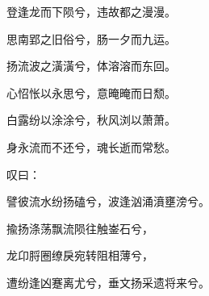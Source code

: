 \documentclass[UTF8,titlepage,oneside]{ctexbook}
\begin{document}
\begin{center}
	登逢龙而下陨兮，违故都之漫漫。
	
	思南郢之旧俗兮，肠一夕而九运。
	
	扬流波之潢潢兮，体溶溶而东回。
	
	心怊怅以永思兮，意晻晻而日颓。
	
	白露纷以涂涂兮，秋风浏以萧萧。
	
	身永流而不还兮，魂长逝而常愁。
	
	叹曰：
	
	譬彼流水纷扬磕兮，波逢汹涌濆壅滂兮。
	
	揄扬涤荡飘流陨往触崟石兮，
	
	龙卬脟圈缭戾宛转阻相薄兮，
	
	遭纷逢凶蹇离尤兮，垂文扬采遗将来兮。
	
	
\end{center}
\end{document}
